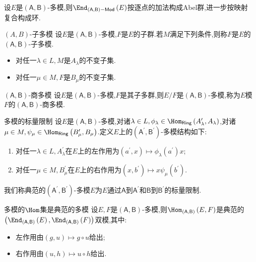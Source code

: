 \begin{proposition}{}{}
	设$E$是$\left(\mathsf{A},\mathsf{B}\right)$-多模,则$\End_{\left(\mathsf{A},\mathsf{B}\right)-\mathsf{Mod}}\left(E\right)$按逐点的加法构成Abel群,进一步按映射复合构成环.
\end{proposition}

\begin{definition}{$\left(A,B\right)$-子多模}{}
	设$E$是$\left(\mathsf{A},\mathsf{B}\right)$-多模,$F$是$E$的子群.若$M$满足下列条件,则称$F$是$E$的$\left(\mathsf{A},\mathsf{B}\right)$-子多模.
	\begin{itemize}
		\item 对任一$\lambda\in L,M$是$A_{\lambda}$的不变子集.
		\item 对任一$\mu\in M,F$是$B_{\mu}$的不变子集.
	\end{itemize}
\end{definition}

\begin{definition}{$\left(\mathsf{A},\mathsf{B}\right)$-商多模}{}
	设$E$是$\left(\mathsf{A},\mathsf{B}\right)$-多模,$F$是其子多群,则$E/F$是$\left(\mathsf{A},\mathsf{B}\right)$-多模,称为$E$模$F$的$\left(\mathsf{A},\mathsf{B}\right)$-商多模.
\end{definition}

\begin{definition}{多模的标量限制}{}
	设$E$是$\left(\mathsf{A},\mathsf{B}\right)$-多模,对诸$\lambda\in L,\phi_{\lambda}\in\Hom_{\mathsf{Ring}}\left(A_{\lambda}^{\prime},A_{\lambda}\right)$,对诸$\mu\in M,\psi_{\mu}\in\Hom_{\mathsf{Ring}}\left(B_{\mu}^{\prime},B_{\mu}\right)$.定义$E$上的$\left(\mathsf{A}^{\prime},\mathsf{B}^{\prime}\right)$-多模结构如下:
	\begin{enumerate}
		\item 对任一$\lambda\in L,A_{\lambda}^{\prime}$在$E$上的左作用为$\left(a^{\prime},x\right)\mapsto\phi_{\lambda}\left(a^{\prime}\right)x$;
		\item 对任一$\mu\in M,B_{\mu}^{\prime}$在$E$上的右作用为$\left(x,b^{\prime}\right)\mapsto x\psi_{\mu}\left(b^{\prime}\right)$.
	\end{enumerate}
	我们称典范的$\left(\mathsf{A}^{\prime},\mathsf{B}^{\prime}\right)$-多模$E$为$E$通过$\mathsf{A}$到$\mathsf{A}^{\prime}$和$\mathsf{B}$到$\mathsf{B}^{\prime}$的标量限制.
\end{definition}

\begin{proposition}{多模的$\Hom$集是典范的多模}{}
	设$E,F$是$\left(\mathsf{A},\mathsf{B}\right)$-多模,则$\Hom_{\left(\mathsf{A},\mathsf{B}\right)}\left(E,F\right)$是典范的$\left(\End_{\left(\mathsf{A},\mathsf{B}\right)}\left(E\right),\End_{\left(\mathsf{A},\mathsf{B}\right)}\left(F\right)\right)$双模,其中:
	\begin{itemize}
		\item 左作用由$\left(g,u\right)\mapsto g\circ u$给出;
		\item 右作用由$\left(u,h\right)\mapsto u\circ h$给出.
	\end{itemize}
\end{proposition}

